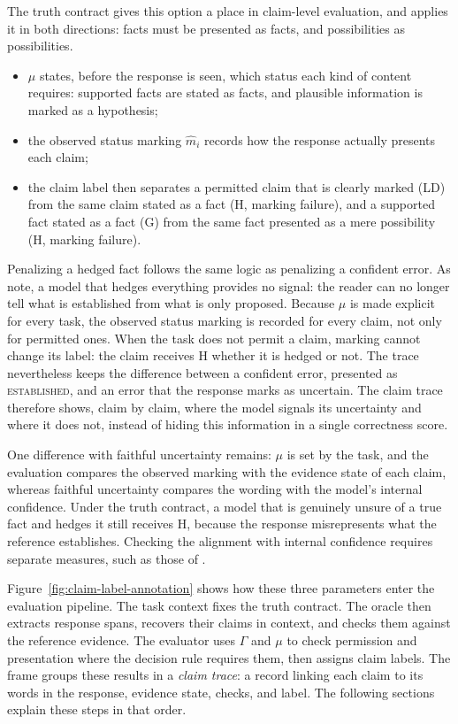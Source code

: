 \documentclass{clv2025}
\newcommand{\LD}{\textsc{LD}}
\newcommand{\Hall}{\textsc{H}}
\newcommand{\Grd}{\textsc{G}}
\begin{document}
The truth contract gives this option a place in claim-level evaluation,
and applies it in both directions: facts must be presented as facts, and
possibilities as possibilities.
\begin{itemize}
\item $\mu$ states, before the response is seen, which status each kind of
content requires: supported facts are stated as facts, and plausible
information is marked as a hypothesis;
\item the observed status marking $\widehat{m}_i$ records how the response
actually presents each claim;
\item the claim label then separates a permitted claim that is clearly
marked (\LD{}) from the same claim stated as a fact (\Hall{}, marking
failure), and a supported fact stated as a fact (\Grd{}) from the same fact
presented as a mere possibility (\Hall{}, marking failure).
\end{itemize}
Penalizing a hedged fact follows the same logic as penalizing a confident
error. As \citet{yona_metacognition_2026} note, a model that hedges
everything provides no signal: the reader can no longer tell what is
established from what is only proposed.
Because $\mu$ is made explicit for every task, the observed status marking
is recorded for every claim, not only for permitted ones. When the task does
not permit a claim, marking cannot change its label: the claim receives
\Hall{} whether it is hedged or not. The trace nevertheless keeps the
difference between a confident error, presented as \textsc{established},
and an error that the response marks as uncertain. The claim trace
therefore shows, claim by claim, where the model signals its uncertainty
and where it does not, instead of hiding this information in a single
correctness score.

One difference with faithful uncertainty remains: $\mu$ is set by the task,
and the evaluation compares the observed marking with the evidence state of
each claim, whereas faithful uncertainty compares the wording with the
model's internal confidence. Under the truth contract, a model that is
genuinely unsure of a true fact and hedges it still receives \Hall{}, because
the response misrepresents what the reference establishes. Checking the
alignment with internal confidence requires separate measures, such as
those of \citet{yona_faithful_2024}.

Figure~\ref{fig:claim-label-annotation} shows how these three parameters
enter the evaluation pipeline. The task context fixes the truth contract.
The oracle then extracts response spans, recovers their claims in context,
and checks them against the reference evidence. The evaluator uses
$\Gamma$ and $\mu$ to check permission and presentation where the decision
rule requires them, then assigns claim labels. The frame groups these
results in a \emph{claim trace}: a record linking each claim to its words
in the response, evidence state, checks, and label. The following sections
explain these steps in that order.
\end{document}
